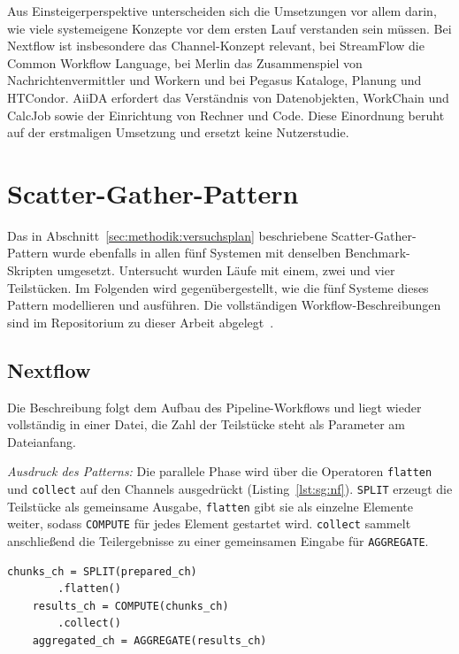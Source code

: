 Aus Einsteigerperspektive unterscheiden sich die Umsetzungen vor
allem darin, wie viele systemeigene Konzepte vor dem ersten Lauf
verstanden sein müssen. Bei Nextflow ist insbesondere das Channel-Konzept relevant, bei StreamFlow die Common Workflow Language, bei Merlin das
Zusammenspiel von Nachrichtenvermittler und Workern und bei Pegasus
Kataloge, Planung und HTCondor. AiiDA erfordert das Verständnis von
Datenobjekten, WorkChain und CalcJob sowie der Einrichtung von
Rechner und Code. Diese Einordnung beruht auf der erstmaligen
Umsetzung und ersetzt keine Nutzerstudie.


\section{Scatter-Gather-Pattern}
\label{sec:lokal:scattergather}

Das in Abschnitt~\ref{sec:methodik:versuchsplan} beschriebene
Scatter-Gather-Pattern wurde ebenfalls in allen fünf Systemen mit
denselben Benchmark-Skripten umgesetzt. Untersucht wurden Läufe mit
einem, zwei und vier Teilstücken. Im Folgenden wird
gegenübergestellt, wie die fünf Systeme dieses Pattern modellieren
und ausführen. Die vollständigen Workflow-Beschreibungen sind im
Repositorium zu dieser Arbeit abgelegt~\cite{barepo}.

\subsection{Nextflow}
\label{sec:lokal:sg:nextflow}

Die Beschreibung folgt dem Aufbau des Pipeline-Workflows und liegt
wieder vollständig in einer Datei, die Zahl der Teilstücke steht als
Parameter am Dateianfang.

\emph{Ausdruck des Patterns:} Die parallele Phase wird über die
Operatoren \texttt{flatten} und \texttt{collect} auf den Channels
ausgedrückt (Listing~\ref{lst:sg:nf}). \texttt{SPLIT} erzeugt die Teilstücke als gemeinsame
Ausgabe, \texttt{flatten} gibt sie als einzelne Elemente weiter,
sodass \texttt{COMPUTE} für jedes Element gestartet wird.
\texttt{collect} sammelt anschließend die Teilergebnisse zu einer
gemeinsamen Eingabe für \texttt{AGGREGATE}.

\begin{lstlisting}[caption={Fan-out und Fan-in im workflow-Block (Nextflow, Scatter-Gather)},label={lst:sg:nf}]
    chunks_ch = SPLIT(prepared_ch)
        .flatten()
    results_ch = COMPUTE(chunks_ch)
        .collect()
    aggregated_ch = AGGREGATE(results_ch)
\end{lstlisting}


